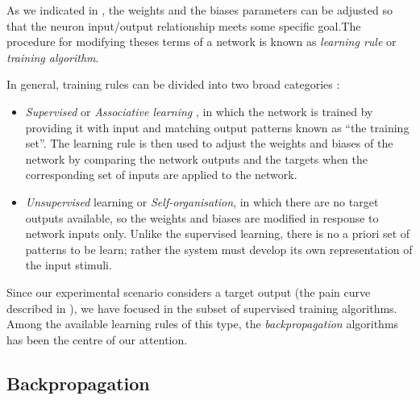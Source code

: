 
\label{sec:learningrules}

As we indicated in , the weights and the biases parameters can be adjusted so that the neuron input/output relationship meets some specific goal.The procedure for modifying theses terms of a network is known as \emph{learning rule} or \emph{training algorithm}. 

In general, training rules can be divided into two broad categories \cite{demuth2008neural}:
\begin{itemize}
\item \emph{Supervised} or \emph{Associative learning}
, in which the network is trained by providing it with input and matching output patterns known as ``the training set''. 
The learning rule is then used to adjust the weights and biases of the network by comparing the network outputs and the targets when the corresponding set of inputs are applied to the network.
\item \emph{Unsupervised} learning or \emph{Self-organisation}, in which there are no target outputs available, so the weights and biases are modified in response to network inputs only. 
Unlike the supervised learning, there is no a priori set of patterns to be learn;
rather the system must develop its own representation of the input stimuli.
\end{itemize}

Since our experimental scenario considers a target output (the pain curve described in ), we have focused in the subset of supervised training algorithms. 
Among the available learning rules of this type, the \emph{backpropagation} algorithms has been the centre of our attention. 

\subsection{Backpropagation}
